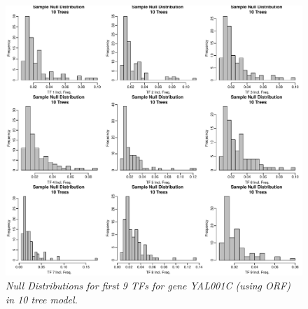 \documentclass[12pt]{article}
\begin{document}
\begin{figure}[H]
\centerline{\includegraphics[scale=.7]{null10.pdf}}
\caption{\it Null Distributions for first 9 TFs for gene YAL001C (using ORF) in 10 tree model.}\label{fig:version2}  
\end{figure}
\end{document}
